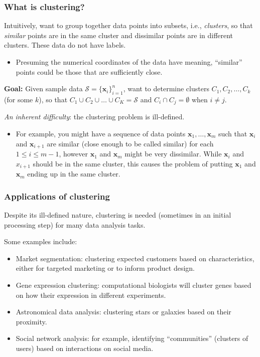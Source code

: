 \documentclass[smaller]{beamer}
\theoremstyle{example}
\newcommand{\x}{\textbf{x}}
\begin{document}
\begin{frame}
    \frametitle{What is clustering?}
    Intuitively, want to group together data points into subsets, i.e., \textit{clusters}, so that \textit{similar} points are in the same cluster and dissimilar points are in different clusters. These data do not have labels. 
    
    \begin{itemize}
        \item Presuming the numerical coordinates of the data have meaning, ``similar'' points could be those that are sufficiently close.
    \end{itemize}
    
    \textbf{Goal:} Given sample data $\mathcal S=\{\x_i\}_{i=1}^n$, want to determine clusters $C_1,C_2,\ldots,C_k$ (for some $k$), so that $C_1\cup C_2\cup \ldots\cup C_K= \mathcal S$ and $C_i\cap C_j = \emptyset$ when $i\ne j$.
    \vfill 

    \textit{An inherent difficulty}: the clustering problem is ill-defined. 
    \begin{itemize}
        \item For example, you might have a sequence of data points $\x_1,\ldots,\x_m$ such that $\x_i$ and $\x_{i+1}$ are similar (close enough to be called similar) for each $1\le i\le m-1$, however $\x_1$ and $\x_m$ might be very dissimilar. While $\x_i$ and $x_{i+1}$ should be in the same cluster, this causes the problem of putting $\x_1$ and $\x_m$ ending up in the same cluster.
    \end{itemize}
\end{frame}

\begin{frame}
    \frametitle{Applications of clustering}
    Despite its ill-defined nature, clustering is needed (sometimes in an initial processing step) for many data analysis tasks. 

    Some examples include:
    \begin{itemize}
        \item Market segmentation: clustering expected customers based on characteristics, either for targeted marketing or to inform product design.
        \item Gene expression clustering: computational biologists will cluster genes based on how their expression in different experiments.
        \item Astronomical data analysis: clustering stars or galaxies based on their proximity.
        \item Social network analysis: for example, identifying ``communities'' (clusters of users) based on interactions on social media.
    \end{itemize}
\end{frame}
\end{document}
